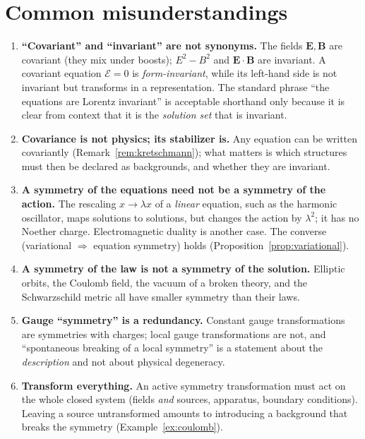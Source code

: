 \section{Common misunderstandings}

\begin{enumerate}[leftmargin=1.8em,itemsep=3pt,label=\textbf{\arabic*.}]
\item \textbf{``Covariant'' and ``invariant'' are not synonyms.} The fields
  ${\bm{E}},{\bm{B}}$ are covariant (they mix under boosts); $E^2-B^2$ and
  ${\bm{E}}\!\cdot\!{\bm{B}}$ are invariant. A covariant equation $\mathcal E=0$ is
  \emph{form-invariant}, while its left-hand side is not invariant but
  transforms in a representation. The standard phrase ``the equations are
  Lorentz invariant'' is acceptable shorthand only because it is clear from
  context that it is the \emph{solution set} that is invariant.
\item \textbf{Covariance is not physics; its stabilizer is.} Any equation can
  be written covariantly (Remark~\ref{rem:kretschmann}); what matters is
  which structures must then be declared as backgrounds, and whether they are
  invariant.
\item \textbf{A symmetry of the equations need not be a symmetry of the action.}
  The rescaling $x\to\lambda x$ of a \emph{linear} equation, such as the
  harmonic oscillator, maps solutions to solutions, but changes the action by
  $\lambda^2$; it has no Noether charge. Electromagnetic duality is another case.
  The converse (variational $\Rightarrow$ equation symmetry) holds
  (Proposition~\ref{prop:variational}).
\item \textbf{A symmetry of the law is not a symmetry of the solution.}
  Elliptic orbits, the Coulomb field, the vacuum of a broken theory, and the
  Schwarzschild metric all have smaller symmetry than their laws.
\item \textbf{Gauge ``symmetry'' is a redundancy.} Constant gauge
  transformations are symmetries with charges; local gauge transformations are
  not, and ``spontaneous breaking of a local symmetry'' is a statement about
  the \emph{description} and not about physical degeneracy.
\item \textbf{Transform everything.} An active symmetry transformation must act on
  the whole closed system (fields \emph{and} sources, apparatus,
  boundary conditions). Leaving a source untransformed amounts to introducing a
  background that breaks the symmetry (Example~\ref{ex:coulomb}).
\end{enumerate}

